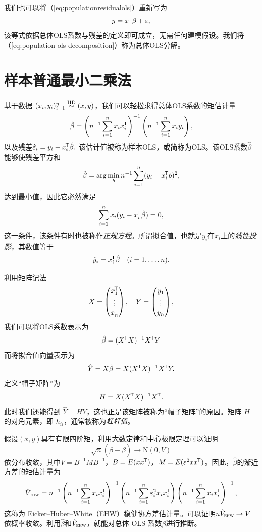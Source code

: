我们也可以将（\ref{eq:populationresidualols}）重新写为
\begin{equation}
y=x ^{\mkern-1.5mu\mathsf{T}} \beta+\varepsilon,\label{eq:population-ols-decomposition}
\end{equation}
该等式依据总体OLS系数与残差的定义即可成立，无需任何建模假设。我们将（\ref{eq:population-ols-decomposition}）称为总体OLS分解。 


 \section{样本普通最小二乘法}\label{sec::sampleOLS}

基于数据 $(x_{i},y_{i})_{i=1}^{n} \stackrel{\textup{IID}}{\sim} (x,y)$，我们可以轻松求得总体OLS系数的矩估计量\[
\hat{\beta}=\left(n^{-1}\sum_{i=1}^n x_{i}x_{i} ^{\mkern-1.5mu\mathsf{T}} \right)^{-1}\left(n^{-1}\sum_{i=1}^n x_{i}y_{i}\right),
\]以及残差$ \hat{\varepsilon}_i = y_i - x_i ^{\mkern-1.5mu\mathsf{T}}  \hat{\beta} . $ 该估计值被称为样本OLS，或简称为OLS。该OLS系数$\hat{\beta}$能够使残差平方和\[
\hat \beta=\arg\min_{b } n^{-1} \sum_{i=1}^n  (y_i-x_i ^{\mkern-1.5mu\mathsf{T}} b)^{2} ,
\]达到最小值，因此它必然满足$$
\sum_{i=1}^n x_i (y_i-x_i ^{\mkern-1.5mu\mathsf{T}} \hat{\beta}) = 0,
$$这一条件，该条件有时也被称作{\it 正规方程}。所谓拟合值，也就是$y_i$在$x_i$上的{\it 线性投影}，其数值等于$$
 \hat{y}_i = x_i^{\mkern-1.5mu\mathsf{T}} \hat\beta \quad (i=1,\ldots, n).
 $$
 
 
 利用矩阵记法
$$
 X = \begin{pmatrix}
 x_1^{\mkern-1.5mu\mathsf{T}} \\
 \vdots \\
 x_n^{\mkern-1.5mu\mathsf{T}} 
 \end{pmatrix},\quad
 Y = \begin{pmatrix}
 y_1 \\
 \vdots \\
 y_n
 \end{pmatrix} ,
 $$
我们可以将OLS系数表示为
$$
\hat{\beta} = (X ^{\mkern-1.5mu\mathsf{T}} X)^{-1} X^{\mkern-1.5mu\mathsf{T}} Y
$$
而将拟合值向量表示为
$$
 \hat{Y} = X\hat{\beta} =  X (X ^{\mkern-1.5mu\mathsf{T}} X)^{-1} X^{\mkern-1.5mu\mathsf{T}} Y.
 $$
定义“帽子矩阵”为
$$
H =  X (X ^{\mkern-1.5mu\mathsf{T}} X)^{-1} X^{\mkern-1.5mu\mathsf{T}}.
$$
此时我们还能得到 $ \hat{Y}  = HY$，这也正是该矩阵被称为“帽子矩阵”的原因。矩阵 $H $ 的对角元素，即 $h_{ii}$，通常被称为{\it 杠杆值}。


假设$(x,y)$具有有限四阶矩，利用大数定律和中心极限定理可以证明
$$
\sqrt{n}(\hat{\beta}-\beta)\rightarrow\text{N} ( 0, V )
$$
依分布收敛，其中$V =  B^{-1} M B^{-1}$，$B =   E(xx ^{\mkern-1.5mu\mathsf{T}} ) $，$M= E(\varepsilon^{2}xx ^{\mkern-1.5mu\mathsf{T}} )$。因此，$\hat{\beta}$的渐近方差的矩估计量为
\begin{equation}\label{eq::v-hat-ehw}
\hat{V}_\textsc{ehw} =  
n^{-1}
\left(n^{-1}\sum_{i=1}^n x_{i}x_{i} ^{\mkern-1.5mu\mathsf{T}} \right)^{-1}
\left(n^{-1}\sum_{i=1}^n  \hat{\varepsilon}_i^2  x_{i}x_{i} ^{\mkern-1.5mu\mathsf{T}} \right) 
\left(n^{-1}\sum_{i=1}^n x_{i}x_{i} ^{\mkern-1.5mu\mathsf{T}} \right)^{-1} ,
\end{equation}
这称为 Eicker--Huber--White（EHW）稳健协方差估计量\citep{eicker1967limit, huber::1967, white::1980}。可以证明$n \hat{V}_\textsc{ehw}  \rightarrow  V$依概率收敛。利用$\hat{\beta}$和$\hat{V}_\textsc{ehw} $，就能对总体 OLS 系数$\beta$进行推断。  


